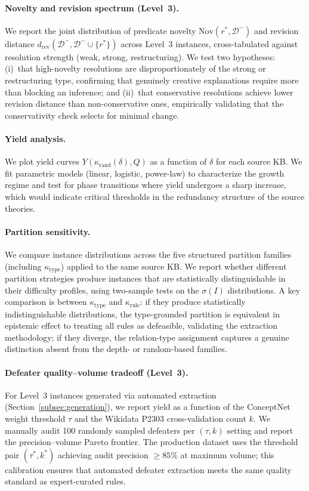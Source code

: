 \documentclass{article}
\theoremstyle{definition}
\newcommand{\Dm}{\mathcal{D}^{-}}
\newcommand{\partfunc}{\kappa}
\newcommand{\Nov}{\mathrm{Nov}}
\begin{document}
\paragraph{Novelty and revision spectrum (Level~3).} We report the joint distribution of predicate novelty $\Nov(r^*, \Dm)$ and revision distance $d_{\mathrm{rev}}(\Dm, \Dm \cup \{r^*\})$ across Level~3 instances, cross-tabulated against resolution strength (weak, strong, restructuring). We test two hypotheses: (i)~that high-novelty resolutions are disproportionately of the strong or restructuring type, confirming that genuinely creative explanations require more than blocking an inference; and (ii)~that conservative resolutions achieve lower revision distance than non-conservative ones, empirically validating that the conservativity check selects for minimal change.

\paragraph{Yield analysis.} We plot yield curves $Y(\partfunc_{\mathrm{rand}}(\delta), Q)$ as a function of $\delta$ for each source KB. We fit parametric models (linear, logistic, power-law) to characterize the growth regime and test for phase transitions where yield undergoes a sharp increase, which would indicate critical thresholds in the redundancy structure of the source theories.

\paragraph{Partition sensitivity.} We compare instance distributions across the five structured partition families (including $\partfunc_{\mathrm{type}}$) applied to the same source KB. We report whether different partition strategies produce instances that are statistically distinguishable in their difficulty profiles, using two-sample tests on the $\sigma(I)$ distributions. A key comparison is between $\partfunc_{\mathrm{type}}$ and $\partfunc_{\mathrm{rule}}$: if they produce statistically indistinguishable distributions, the type-grounded partition is equivalent in epistemic effect to treating all rules as defeasible, validating the extraction methodology; if they diverge, the relation-type assignment captures a genuine distinction absent from the depth- or random-based families.

\paragraph{Defeater quality--volume tradeoff (Level~3).} For Level~3 instances generated via automated extraction (Section~\ref{subsec:generation}), we report yield as a function of the ConceptNet weight threshold $\tau$ and the Wikidata P2303 cross-validation count $k$. We manually audit 100 randomly sampled defeaters per $(\tau, k)$ setting and report the precision--volume Pareto frontier. The production dataset uses the threshold pair $(\tau^*, k^*)$ achieving audit precision $\geq 85\%$ at maximum volume; this calibration ensures that automated defeater extraction meets the same quality standard as expert-curated rules.
\end{document}
